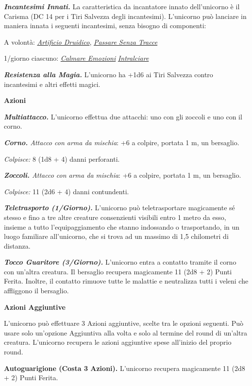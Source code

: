 \begin{multicols}{2}
{\emph{\textbf{Incantesimi Innati.}} La caratteristica da incantatore innato dell'unicorno è il Carisma (DC 14 per i Tiri Salvezza degli incantesimi). L'unicorno può lanciare in maniera innata i seguenti incantesimi, senza bisogno di componenti:

A volontà: \emph{\hyperlink{Artificio Druidico}{Artificio Druidico}}, \emph{\hyperlink{Passare Senza Tracce}{Passare Senza Tracce}}

1/giorno ciascuno: \emph{\hyperlink{Calmare Emozioni}{Calmare Emozioni}} \emph{\hyperlink{Intralciare}{Intralciare}}

\emph{\textbf{Resistenza alla Magia.}} L'unicorno ha +1d6 ai Tiri Salvezza contro incantesimi e altri effetti magici.

\textbf{Azioni}

\emph{\textbf{Multiattacco.}} L'unicorno effettua due attacchi: uno con gli zoccoli e uno con il corno.

\emph{\textbf{Corno.} Attacco con arma da mischia}: +6 a colpire, portata 1 m, un bersaglio.

\emph{Colpisce:} 8 (1d8 + 4) danni perforanti.

\emph{\textbf{Zoccoli.} Attacco con arma da mischia}: +6 a colpire, portata 1 m, un bersaglio.

\emph{Colpisce:} 11 (2d6 + 4) danni contundenti.

\emph{\textbf{Teletrasporto (1/Giorno).}} L'unicorno può teletrasportare magicamente sé stesso e fino a tre altre creature consenzienti visibili entro 1 metro da esso, insieme a tutto l'equipaggiamento che stanno indossando o trasportando, in un luogo familiare all'unicorno, che si trova ad un massimo di 1,5 chilometri di distanza.

\emph{\textbf{Tocco Guaritore (3/Giorno).}} L'unicorno entra a contatto tramite il corno con un'altra creatura. Il bersaglio recupera magicamente 11 (2d8 + 2) Punti Ferita. Inoltre, il contatto rimuove tutte le malattie e neutralizza tutti i veleni che affliggono il bersaglio.

\textbf{Azioni Aggiuntive}

L'unicorno può effettuare 3 Azioni aggiuntive, scelte tra le opzioni seguenti. Può usare solo un'opzione Aggiuntiva alla volta e solo al termine del round di un'altra creatura. L'unicorno recupera le azioni aggiuntive spese all'inizio del proprio round.

\textbf{Autoguarigione (Costa 3 Azioni).} L'unicorno recupera magicamente 11 (2d8 + 2) Punti Ferita.

}
\end{multicols}
